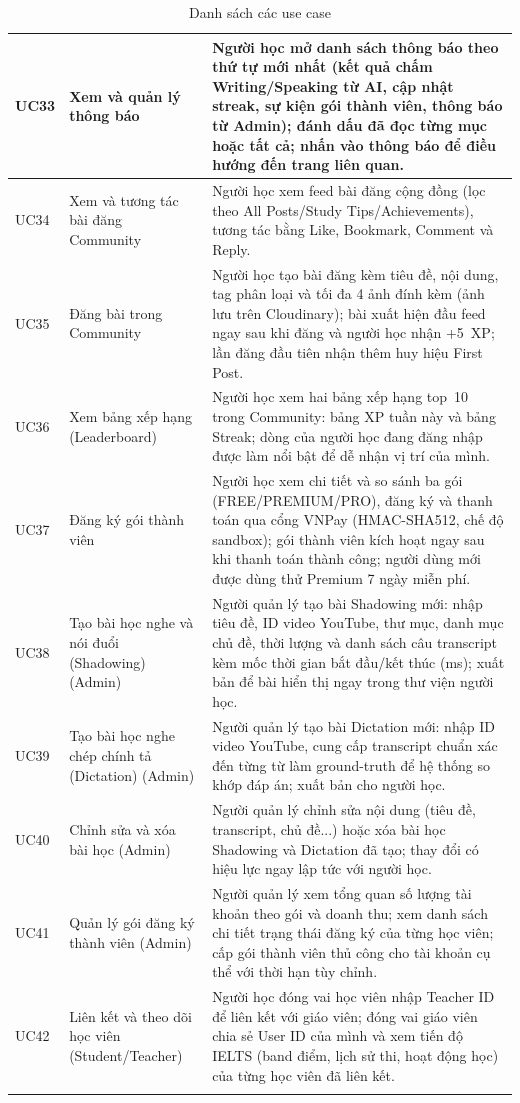 \begin{longtable}{|p{15\tbu}|p{45\tbu}|p{90\tbu}|}
    UC33 & Xem và quản lý thông báo & Người học mở danh sách thông báo theo thứ tự mới nhất (kết quả chấm Writing/Speaking từ AI, cập nhật streak, sự kiện gói thành viên, thông báo từ Admin); đánh dấu đã đọc từng mục hoặc tất cả; nhấn vào thông báo để điều hướng đến trang liên quan. \\ \hline
    UC34 & Xem và tương tác bài đăng Community & Người học xem feed bài đăng cộng đồng (lọc theo All Posts/Study Tips/Achievements), tương tác bằng Like, Bookmark, Comment và Reply. \\ \hline
    UC35 & Đăng bài trong Community & Người học tạo bài đăng kèm tiêu đề, nội dung, tag phân loại và tối đa 4 ảnh đính kèm (ảnh lưu trên Cloudinary); bài xuất hiện đầu feed ngay sau khi đăng và người học nhận +5~XP; lần đăng đầu tiên nhận thêm huy hiệu First Post. \\ \hline
    UC36 & Xem bảng xếp hạng (Leaderboard) & Người học xem hai bảng xếp hạng top~10 trong Community: bảng XP tuần này và bảng Streak; dòng của người học đang đăng nhập được làm nổi bật để dễ nhận vị trí của mình. \\ \hline
    UC37 & Đăng ký gói thành viên & Người học xem chi tiết và so sánh ba gói (FREE/PREMIUM/PRO), đăng ký và thanh toán qua cổng VNPay (HMAC-SHA512, chế độ sandbox); gói thành viên kích hoạt ngay sau khi thanh toán thành công; người dùng mới được dùng thử Premium 7 ngày miễn phí. \\ \hline
    UC38 & Tạo bài học nghe và nói đuổi (Shadowing) (Admin) & Người quản lý tạo bài Shadowing mới: nhập tiêu đề, ID video YouTube, thư mục, danh mục chủ đề, thời lượng và danh sách câu transcript kèm mốc thời gian bắt đầu/kết thúc (ms); xuất bản để bài hiển thị ngay trong thư viện người học. \\ \hline
    UC39 & Tạo bài học nghe chép chính tả (Dictation) (Admin) & Người quản lý tạo bài Dictation mới: nhập ID video YouTube, cung cấp transcript chuẩn xác đến từng từ làm ground-truth để hệ thống so khớp đáp án; xuất bản cho người học. \\ \hline
    UC40 & Chỉnh sửa và xóa bài học (Admin) & Người quản lý chỉnh sửa nội dung (tiêu đề, transcript, chủ đề...) hoặc xóa bài học Shadowing và Dictation đã tạo; thay đổi có hiệu lực ngay lập tức với người học. \\ \hline
    UC41 & Quản lý gói đăng ký thành viên (Admin) & Người quản lý xem tổng quan số lượng tài khoản theo gói và doanh thu; xem danh sách chi tiết trạng thái đăng ký của từng học viên; cấp gói thành viên thủ công cho tài khoản cụ thể với thời hạn tùy chỉnh. \\ \hline
    UC42 & Liên kết và theo dõi học viên (Student/Teacher) & Người học đóng vai học viên nhập Teacher ID để liên kết với giáo viên; đóng vai giáo viên chia sẻ User ID của mình và xem tiến độ IELTS (band điểm, lịch sử thi, hoạt động học) của từng học viên đã liên kết. \\ \hline
    \caption{Danh sách các use case}
    \label{tab:uc_list}
\end{longtable}

